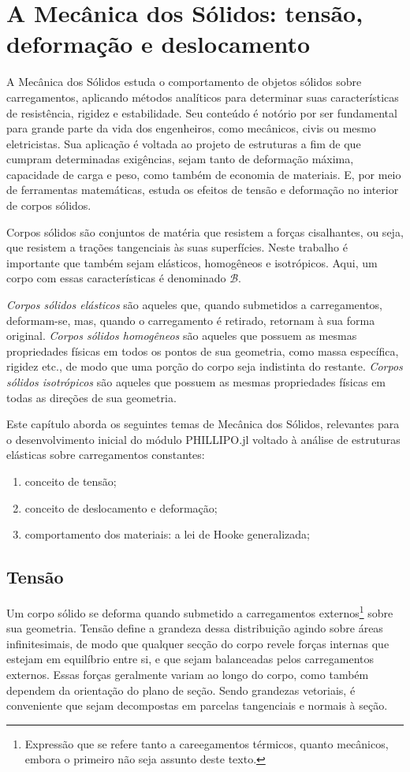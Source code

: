 \chapter{A Mecânica dos Sólidos: tensão, deformação e deslocamento}

A Mecânica dos Sólidos estuda o comportamento de objetos sólidos sobre carregamentos, aplicando métodos analíticos para determinar suas características de resistência, rigidez e estabilidade. Seu conteúdo é notório por ser fundamental para grande parte da vida dos engenheiros, como mecânicos, civis ou mesmo eletricistas. Sua aplicação é voltada ao projeto de estruturas a fim de que cumpram determinadas exigências, sejam tanto de deformação máxima, capacidade de carga e peso, como também de economia de materiais. E, por meio de ferramentas matemáticas, estuda os efeitos de tensão e deformação no interior de corpos sólidos. \cite[pág. 2]{popov}

Corpos sólidos são conjuntos de matéria que resistem a forças cisalhantes, ou seja, que resistem a trações tangenciais às suas superfícies. Neste trabalho é importante que também sejam elásticos, homogêneos e isotrópicos. Aqui, um corpo com essas características é denominado $\mathcal{B}$.

\emph{Corpos sólidos elásticos} são aqueles que, quando submetidos a carregamentos, deformam-se, mas, quando o carregamento é retirado, retornam à sua forma original. \emph{Corpos sólidos homogêneos} são aqueles que possuem as mesmas propriedades físicas em todos os pontos de sua geometria, como massa específica, rigidez etc., de modo que uma porção do corpo seja indistinta do restante. \emph{Corpos sólidos isotrópicos} são aqueles que possuem as mesmas propriedades físicas em todas as direções de sua geometria.

Este capítulo aborda os seguintes temas de Mecânica dos Sólidos, relevantes para o desenvolvimento inicial do módulo PHILLIPO.jl voltado à análise de estruturas elásticas sobre carregamentos constantes:
\begin{enumerate}
    \item conceito de tensão;
    \item conceito de deslocamento e deformação;
    \item comportamento dos materiais: a lei de Hooke generalizada;
\end{enumerate}

\section{Tensão}
Um corpo sólido se deforma quando submetido a carregamentos externos\footnote{Expressão que se refere tanto a careegamentos térmicos, quanto mecânicos, embora o primeiro não seja assunto deste texto.} sobre sua geometria. Tensão define a grandeza dessa distribuição agindo sobre áreas infinitesimais, de modo que qualquer secção do corpo revele forças internas que estejam em equilíbrio entre si, e que sejam balanceadas pelos carregamentos externos. Essas forças geralmente variam ao longo do corpo, como também dependem da orientação do plano de seção. Sendo grandezas vetoriais, é conveniente que sejam decompostas em parcelas tangenciais e normais à seção. \cite[pág. 60]{popov}


